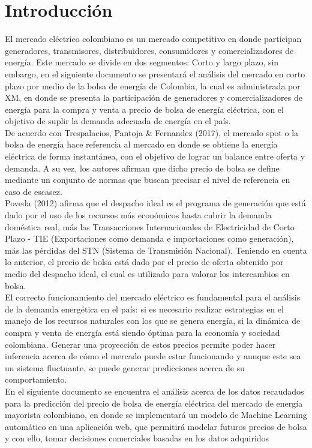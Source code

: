 \documentclass[conference, 10pt]{IEEEtran}
\begin{document}
\section{Introducción}
El mercado eléctrico colombiano es un mercado competitivo en donde participan generadores, transmisores, distribuidores, consumidores y comercializadores de energía. Este mercado se divide en dos segmentos: Corto y largo plazo, sin embargo, en el siguiente documento se presentará el análisis del mercado en corto plazo por medio de la bolsa de energía de Colombia, la cual es administrada por XM, en donde se presenta la participación de generadores y comercializadores de energía para la compra y venta a precio de bolsa de energía eléctrica, con el objetivo de suplir la demanda adecuada de energía en el país.\\
De acuerdo con Trespalacios, Pantoja \& Fernandez (2017)\cite{b5}, el mercado spot o la bolsa de energía hace referencia al mercado en donde se obtiene la energía eléctrica de forma instantánea, con el objetivo de lograr un balance entre oferta  y demanda. A su vez, los autores afirman que dicho precio de bolsa se define mediante un conjunto de normas que buscan precisar el nivel de referencia en caso de escasez.\\
Poveda (2012) \cite{b1} afirma que el despacho ideal es el programa de generación que está dado por el uso de los recursos más económicos hasta cubrir la demanda doméstica real, más las Transacciones Internacionales de Electricidad de Corto Plazo - TIE (Exportaciones como demanda e importaciones como generación), más las pérdidas del STN (Sistema de Transmisión Nacional). Teniendo en cuenta lo anterior, el precio de bolsa está dado por el precio de oferta obtenido por medio del despacho ideal, el cual es utilizado para valorar los intercambios en bolsa.\\
El correcto funcionamiento del mercado eléctrico es fundamental para el análisis de la demanda energética en el país: si es necesario realizar estrategias en el manejo de los recursos naturales con los que se genera energía, si la dinámica de compra y venta de energía está siendo óptima para la economía y sociedad colombiana. Generar una proyección de estos precios permite poder hacer inferencia acerca de cómo el mercado puede estar funcionando y aunque este sea un sistema fluctuante, se puede generar predicciones acerca de su comportamiento.\\

En el siguiente documento se encuentra el análisis acerca de los datos recaudados para la predicción del precio de bolsa de energía eléctrica del mercado de energía mayorista colombiano, en donde se implementará un modelo de Machine Learning automático en una aplicación web, que permitirá modelar futuros precios de bolsa y con ello, tomar decisiones comerciales basadas en los datos adquiridos
\end{document}
